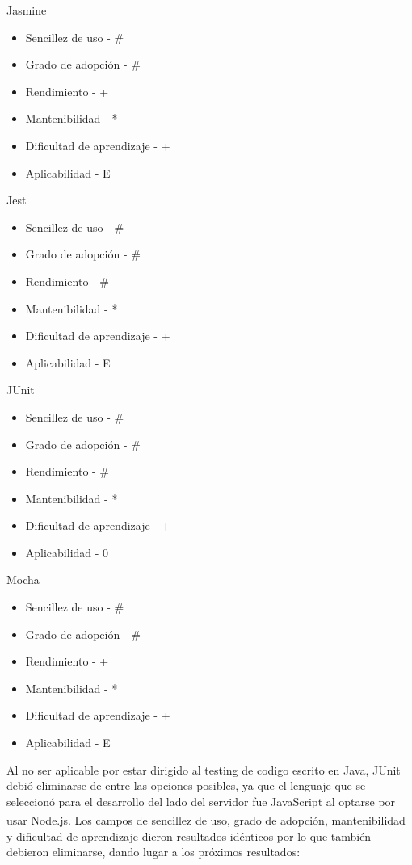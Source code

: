 \documentclass[twoside]{article}
\begin{document}
Jasmine
\begin{itemize}
    \item Sencillez de uso - \#
    \item Grado de adopción - \#
    \item Rendimiento - +
    \item Mantenibilidad - *
    \item Dificultad de aprendizaje - +
    \item Aplicabilidad - E
\end{itemize}
Jest
\begin{itemize}
    \item Sencillez de uso - \#
    \item Grado de adopción - \#
    \item Rendimiento - \#
    \item Mantenibilidad - *
    \item Dificultad de aprendizaje - +
    \item Aplicabilidad - E 
\end{itemize}
JUnit
\begin{itemize}
    \item Sencillez de uso - \#
    \item Grado de adopción - \#
    \item Rendimiento - \#
    \item Mantenibilidad - *
    \item Dificultad de aprendizaje - +
    \item Aplicabilidad - 0
\end{itemize}
Mocha
\begin{itemize}
    \item Sencillez de uso - \#
    \item Grado de adopción - \#
    \item Rendimiento - +
    \item Mantenibilidad - *
    \item Dificultad de aprendizaje - +
    \item Aplicabilidad - E
\end{itemize}
Al no ser aplicable por estar dirigido al testing de codigo escrito en Java, JUnit debió eliminarse de entre las opciones posibles, ya que el lenguaje que se seleccionó para el desarrollo del lado del servidor fue JavaScript al optarse por usar Node.js\textsuperscript{\textregistered}. Los campos de sencillez de uso, grado de adopción, mantenibilidad y dificultad de aprendizaje dieron resultados idénticos por lo que también debieron eliminarse, dando lugar a los próximos resultados:
\end{document}
